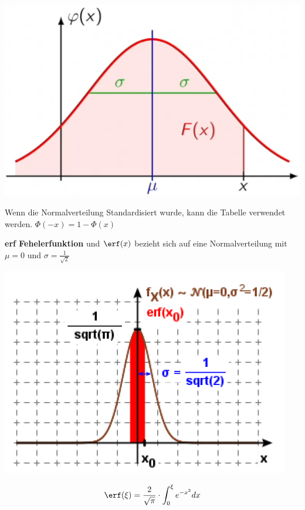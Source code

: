 \begin{center}
	\includegraphics[width=0.4\columnwidth]{Images/normalverteilung}
\end{center}

\noindent Wenn die Normalverteilung Standardisiert wurde, kann die Tabelle verwendet werden. $\Phi(-x) = 1 - \Phi(x)$


\textbf{erf Fehelerfunktion}  und 
$\erf(x)$ bezieht sich auf eine Normalverteilung mit $\mu = 0$ und $\sigma = \frac{1}{\sqrt{2}}$\\
\begin{minipage}{0.20\textwidth}
	\includegraphics[width=\columnwidth]{Images/erf}
\end{minipage}%
\begin{minipage}{0.30\textwidth}
	\[
	\erf(\xi) = \frac{2}{\sqrt{\pi}}\cdot\int_{0}^{\xi}e^{-x^2}dx
	\]
\end{minipage}


